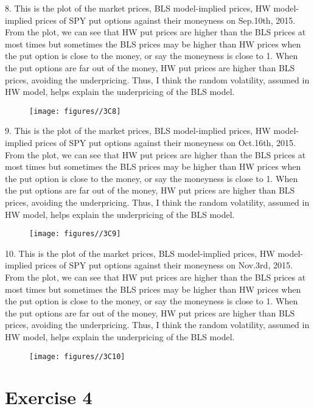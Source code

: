 \documentclass{report}
\begin{document}
8. This is the plot of the market prices, BLS model-implied prices, HW model-implied prices of SPY put options against their moneyness on Sep.10th, 2015. From the plot, we can see that HW put prices are higher than the BLS prices at most times but sometimes the BLS prices may be higher than HW prices when the put option is close to the money, or say the moneyness is close to 1. When the put options are far out of the money, HW put prices are higher than BLS prices, avoiding the underpricing. Thus, I think the random volatility, assumed in HW model, helps explain the underpricing of the BLS model.
\begin{figure}[H]
        \centering 
         \texttt{[image: figures//3C8]}
\end{figure}

9. This is the plot of the market prices, BLS model-implied prices, HW model-implied prices of SPY put options against their moneyness on Oct.16th, 2015. From the plot, we can see that HW put prices are higher than the BLS prices at most times but sometimes the BLS prices may be higher than HW prices when the put option is close to the money, or say the moneyness is close to 1. When the put options are far out of the money, HW put prices are higher than BLS prices, avoiding the underpricing. Thus, I think the random volatility, assumed in HW model, helps explain the underpricing of the BLS model.
\begin{figure}[H]
        \centering 
         \texttt{[image: figures//3C9]}
\end{figure}

10. This is the plot of the market prices, BLS model-implied prices, HW model-implied prices of SPY put options against their moneyness on Nov.3rd, 2015. From the plot, we can see that HW put prices are higher than the BLS prices at most times but sometimes the BLS prices may be higher than HW prices when the put option is close to the money, or say the moneyness is close to 1. When the put options are far out of the money, HW put prices are higher than BLS prices, avoiding the underpricing. Thus, I think the random volatility, assumed in HW model, helps explain the underpricing of the BLS model.
\begin{figure}[H]
        \centering 
         \texttt{[image: figures//3C10]}
\end{figure}
\section{Exercise 4}
\end{document}
